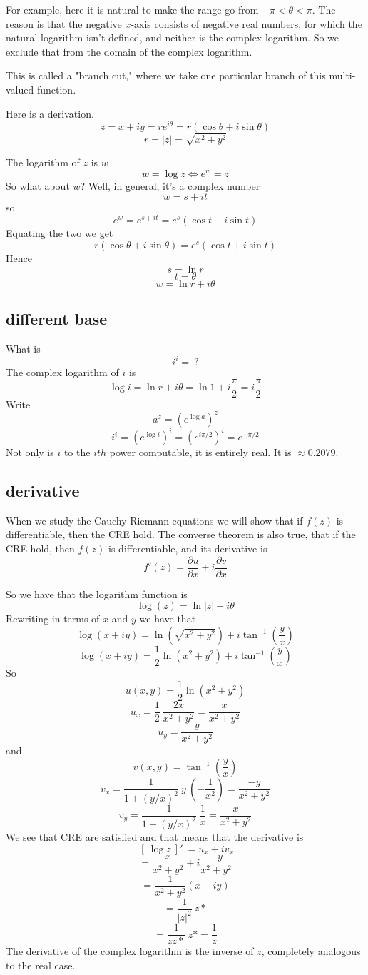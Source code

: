\documentclass[11pt, oneside]{article}   	%
\begin{document}
For example, here it is natural to make the range go from $-\pi < \theta < \pi$.  The reason is that the negative $x$-axis consists of negative real numbers, for which the natural logarithm isn't defined, and neither is the complex logarithm.  So we exclude that from the domain of the complex logarithm.  

This is called a "branch cut," where we take one particular branch of this multi-valued function.

Here is a derivation.  
\[ z = x + iy = re^{i\theta} = r(\cos \theta + i \sin \theta) \]
\[ r = |z| = \sqrt{x^2 + y^2} \]

The logarithm of $z$ is $w$
\[ w = \log z \iff e^w = z \]
So what about $w$? Well, in general, it's a complex number
\[ w = s + it \]
so
\[ e^w = e^{s + it} = e^s (\cos t + i \sin t) \]
Equating the two we get
\[ r (\cos \theta + i \sin \theta) = e^s (\cos t + i \sin t) \]
Hence
\[ s = \ln r \]
\[ t = \theta \]
\[ w = \ln r + i \theta \]
\subsection*{different base}
What is 
\[ i^i = \  ? \]
The complex logarithm of $i$ is
\[ \log i = \ln r + i \theta = \ln 1 + i \frac{\pi}{2} =  i \frac{\pi}{2} \]
 Write
\[ a^z = (e^{\log a})^z \]
\[ i^i = (e^{\log i})^i = (e^{i \pi/2})^i = e^{-\pi/2} \]
Not only is $i$ to the $ith$ power computable, it is entirely real.  It is $\approx 0.2079$.
\subsection*{derivative}
When we study the Cauchy-Riemann equations we will show that if $f(z)$ is differentiable, then the CRE hold.  The converse theorem is also true, that if the CRE hold, then $f(z)$ is differentiable, and its derivative is
\[ f'(z) = \frac{\partial u}{\partial x} + i \frac{\partial v}{\partial x} \]

So we have that the logarithm function is
\[ \log(z) = \ln |z| + i \theta \]
Rewriting in terms of $x$ and $y$ we have that
\[ \log (x+iy) = \ln (\sqrt{x^2 + y^2}) + i \tan^{-1} (\frac{y}{x}) \]
\[ \log (x+iy) = \frac{1}{2} \ln (x^2 + y^2) + i \tan^{-1} (\frac{y}{x}) \]
So
\[ u(x,y) = \frac{1}{2} \ln (x^2 + y^2) \]
\[ u_x = \frac{1}{2} \ \frac{2x}{x^2 + y^2} = \frac{x}{x^2 + y^2} \]
\[ u_y = \frac{y}{x^2 + y^2} \]
and 
\[ v(x,y) = \tan^{-1} (\frac{y}{x}) \]
\[ v_x = \frac{1}{1 + (y/x)^2} \ y \ (-\frac{1}{x^2}) = \frac{-y}{x^2 + y^2} \]
\[ v_y = \frac{1}{1 + (y/x)^2} \ \frac{1}{x} = \frac{x}{x^2 + y^2} \]
We see that CRE are satisfied and that means that the derivative is
\[ \ [ \ \log z \ ] ' \ = u_x + i v_x \]
\[ = \frac{x}{x^2 + y^2} + i \frac{-y}{x^2 + y^2} \] 
\[ = \frac{1}{x^2 + y^2} (x - i y) \]
\[ = \frac{1}{|z|^2} \ z* \]
\[ =  \frac{1}{zz*} \ z* = \frac{1}{z} \]
The derivative of the complex logarithm is the inverse of $z$, completely analogous to the real case.
\end{document}
